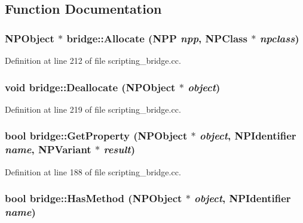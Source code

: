 \subsection{Function Documentation}
\hypertarget{namespacebridge_ae58f18af3f934ea07927cad4684a2268}{
\subsubsection[{Allocate}]{\setlength{\rightskip}{0pt plus 5cm}NPObject $\ast$ bridge::Allocate (NPP {\em npp}, \/  NPClass $\ast$ {\em npclass})}}
\label{namespacebridge_ae58f18af3f934ea07927cad4684a2268}


Definition at line 212 of file scripting\_\-bridge.cc.

\hypertarget{namespacebridge_a86398e4bdb21e998ec4253665b85a921}{
\subsubsection[{Deallocate}]{\setlength{\rightskip}{0pt plus 5cm}void bridge::Deallocate (NPObject $\ast$ {\em object})}}
\label{namespacebridge_a86398e4bdb21e998ec4253665b85a921}


Definition at line 219 of file scripting\_\-bridge.cc.

\hypertarget{namespacebridge_a11a494eb8aee0e3358e49c0a07180cd5}{
\subsubsection[{GetProperty}]{\setlength{\rightskip}{0pt plus 5cm}bool bridge::GetProperty (NPObject $\ast$ {\em object}, \/  NPIdentifier {\em name}, \/  NPVariant $\ast$ {\em result})}}
\label{namespacebridge_a11a494eb8aee0e3358e49c0a07180cd5}


Definition at line 188 of file scripting\_\-bridge.cc.

\hypertarget{namespacebridge_a7c2e2883ad7956550e796e9c302f52af}{
\subsubsection[{HasMethod}]{\setlength{\rightskip}{0pt plus 5cm}bool bridge::HasMethod (NPObject $\ast$ {\em object}, \/  NPIdentifier {\em name})}}
\label{namespacebridge_a7c2e2883ad7956550e796e9c302f52af}


